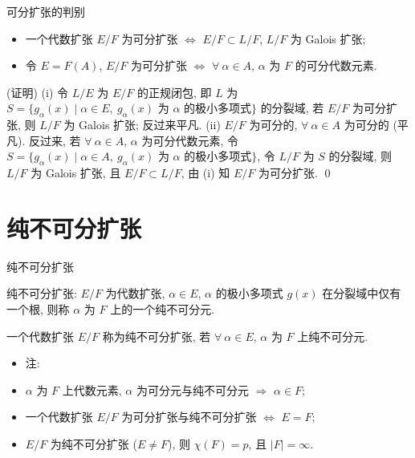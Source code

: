 \begin{frame}{可分扩张的判别}

\begin{cor}[可分扩张的判别]
\begin{itemize}
\item[(i)] 一个代数扩张 $E/F$ 为可分扩张 $\iff$
  $E/F \subset L/F$, $L/F$ 为 Galois 扩张;
\item[(ii)] 令 $E = F(A)$, $E/F$ 为可分扩张 $\iff$
  $\forall\ \alpha \in A$, $\alpha$ 为 $F$ 的可分代数元素.
\end{itemize}
\end{cor}

\startproof[bg=yellow, fg=red](证明)
(i) 令 $L/E$ 为 $E/F$ 的正规闭包,
即 $L$ 为 $S = \{ g_{\alpha}(x) \mid \alpha \in E,\ g_{\alpha}(x) \text{ 为 }
\alpha \text{ 的极小多项式} \}$ 的分裂域,
若 $E/F$ 为可分扩张, 则 $L/F$ 为 Galois 扩张;
反过来平凡.
(ii) $E/F$ 为可分的, $\forall\ \alpha \in A$ 为可分的 (平凡).
反过来, 若 $\forall\ \alpha \in A$, $\alpha$ 为可分代数元素,
令 $S = \{ g_{\alpha}(x) \mid \alpha \in A,\ g_{\alpha}(x) \text{ 为 } \alpha \text{ 的极小多项式} \}$,
令 $L/F$ 为 $S$ 的分裂域, 则 $L/F$ 为 Galois 扩张, 且 $E/F \subset L/F$,
由 (i) 知 $E/F$ 为可分扩张.
\qed

\end{frame}


\section[纯不可分]{纯不可分扩张}


\begin{frame}{纯不可分扩张}

纯不可分扩张:
$E/F$ 为代数扩张, $\alpha \in E$, $\alpha$ 的极小多项式 $g(x)$
在分裂域中仅有一个根, 则称 $\alpha$ 为 $F$ 上的一个纯不可分元.

\pause

一个代数扩张 $E/F$ 称为纯不可分扩张, 若 $\forall\ \alpha \in E$,
$\alpha$ 为 $F$ 上纯不可分元.

\pause

\begin{itemize}
\item 注:
\item {} $\alpha$ 为 $F$ 上代数元素, $\alpha$ 为可分元与纯不可分元
  $\Longrightarrow$ $\alpha \in F$;
\item {} 一个代数扩张 $E/F$ 为可分扩张与纯不可分扩张 $\iff$ $E = F$;
\item {} $E/F$ 为纯不可分扩张 ($E \neq F$), 则 $\chi(F) = p$, 且 $|F| = \infty$.
\end{itemize}

\end{frame}

